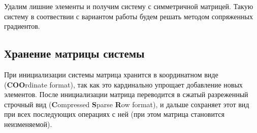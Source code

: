 Удалим лишние элементы и получим систему с симметричной матрицей.
Такую систему в соотвествии с вариантом работы будем решать методом сопряженных градиентов.

\subsection{Хранение матрицы системы}
При инициализации системы матрица хранится в координатном виде (\textbf{COO}rdinate format),
так как это кардинально упрощает добавление новых элементов.
После инициализации матрица переводится в сжатый разреженный строчный вид (\textbf{C}ompressed \textbf{S}parse \textbf{R}ow format),
и дальше сохраняет этот вид при всех последующих операциях с ней (при этом матрица становится неизменяемой).

